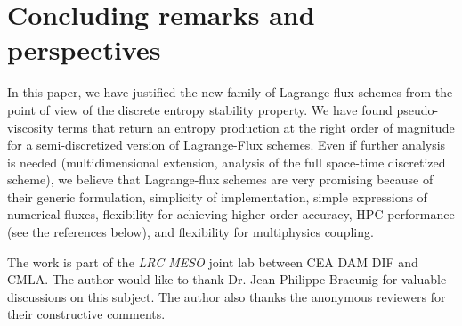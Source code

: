 \documentclass[graybox]{svmult}
\begin{document}
\section{Concluding remarks and perspectives}
%
\vspace{-0.3cm}
In this paper, we have justified the new family of Lagrange-flux schemes
from the point of view of the discrete entropy stability property. We have found
pseudo-viscosity terms that return an entropy production at the right order of
magnitude for a semi-discretized version of Lagrange-Flux schemes.
Even if further analysis is needed (multidimensional extension, analysis of the full space-time discretized scheme), we believe that Lagrange-flux schemes are very promising because of their
generic formulation, simplicity of implementation, simple expressions of numerical fluxes, flexibility for achieving higher-order accuracy, HPC performance (see the references below),
and flexibility for multiphysics coupling. 
%
%
\vspace{-0.4cm}
\begin{acknowledgement}
The work is part of the \emph{LRC MESO} joint lab between CEA DAM DIF and CMLA. The author would like to thank Dr. Jean-Philippe Braeunig for valuable discussions on this subject.
The author also thanks the anonymous reviewers for their constructive comments.
\end{acknowledgement}
%
%


\vspace{-0.9cm}


\end{document}
